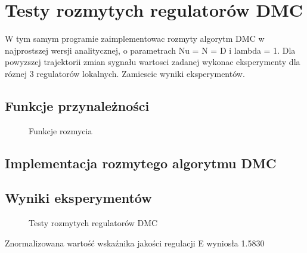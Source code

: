 \section{Testy rozmytych regulatorów DMC}
\label{lab:zad5}

W tym samym programie zaimplementowac rozmyty algorytm DMC w najprostszej
wersji analitycznej, o parametrach Nu = N = D i lambda = 1. Dla powyzszej trajektorii
zmian sygnału wartosci zadanej wykonac eksperymenty dla róznej 3 regulatorów
lokalnych. Zamiescic wyniki eksperymentów.



\subsection{Funkcje przynależności}
\label{lab:zad5:fuzzyFunction}

\begin{figure}[H] 
    \centering
    
    \caption{Funkcje rozmycia}
    \label{lab:zad5:fuzzyFunction:figure}
 \end{figure}

\newpage

\subsection{Implementacja rozmytego algorytmu DMC}
\label{lab:zad5:implDMC}


\newpage

\subsection{Wyniki eksperymentów}
\label{lab:zad5:eksperymenty}

\begin{figure}[H] 
   \centering
   
   \caption{Testy rozmytych regulatorów DMC}
   \label{lab:zad5:eksperymenty:figure}
\end{figure}

Znormalizowana wartość wskaźnika jakości regulacji E wyniosła \num{1.5830}

\newpage
